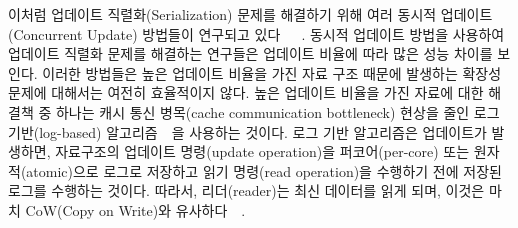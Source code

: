 이처럼 업데이트 직렬화(Serialization) 문제를 해결하기 위해 여러 동시적 업데이트(Concurrent Update)
 방법들이 연구되고
 있다~\cite{Arbel2014ConcurrentRCU}~\cite{Matveev2015RLU}~\cite{Dodds2015SCT}.
동시적 업데이트 방법을 사용하여 업데이트 직렬화 문제를 해결하는 연구들은 
업데이트 비율에 따라 많은 성능 차이를 보인다.
이러한 방법들은 높은 업데이트 비율을 가진 자료 구조 때문에 발생하는 확장성 문제에 
대해서는 여전히 효율적이지 않다.  
높은 업데이트 비율을 가진 자료에 대한 해결책 중 하나는 캐시 통신 병목(cache communication bottleneck)
현상을 줄인 로그 기반(log-based) 알고리즘~\cite{Hendler2010FC}~\cite{SilasBoydWickizerPth}을
사용하는 것이다.
로그 기반 알고리즘은 업데이트가 발생하면, 자료구조의 업데이트 명령(update operation)을
퍼코어(per-core) 또는 원자적(atomic)으로 로그로 저장하고 읽기 명령(read operation)을 수행하기
 전에 저장된 로그를 수행하는 것이다.
따라서, 리더(reader)는 최신 데이터를 읽게 되며, 이것은 마치 CoW(Copy on Write)와
유사하다~\cite{PaulDetailLWN}~\cite{Morrison2016SSM}.

